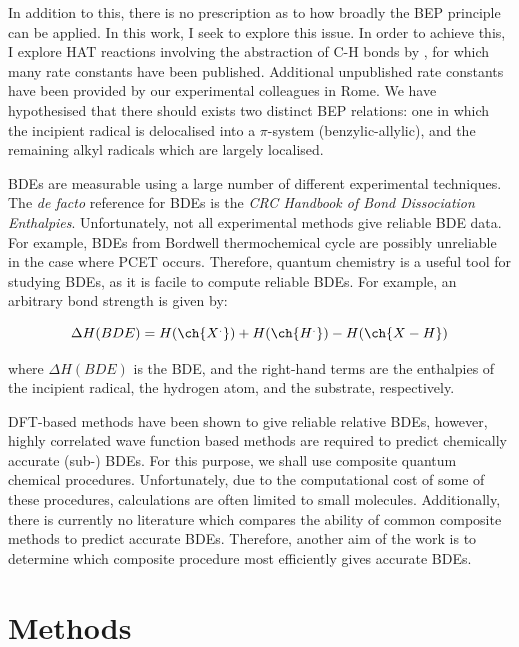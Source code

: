 In addition to this, there is no prescription as to how broadly the BEP principle can be applied. In this work, I seek to explore this issue. In order to achieve this, I explore HAT reactions involving the abstraction of C-H bonds by \cumo, for which many rate constants have been published.\cite{Bietti2010, Bietti2011, Pischel2001, Salamone2011, Salamone2012, Salamone2012a, Salamone2013, Salamone2015} Additional unpublished rate constants have been provided by our experimental colleagues in Rome. We have hypothesised that there should exists two distinct BEP relations: one in which the incipient radical is delocalised into a $\pi$-system (benzylic-allylic), and the remaining alkyl radicals which are largely localised.

BDEs are measurable using a large number of different experimental techniques. The \emph{de facto} reference for BDEs is the \emph{CRC Handbook of Bond Dissociation Enthalpies}.\cite{Luo2002} Unfortunately, not all experimental methods give reliable BDE data. For example, BDEs from Bordwell\cite{Bordwell1988} thermochemical cycle are possibly unreliable in the case where PCET occurs.\cite{Miller2016} Therefore, quantum chemistry is a useful tool for studying BDEs, as it is facile to compute reliable BDEs. For example, an arbitrary  bond strength is given by:

\begin{equation}
  \Delta H(BDE) =  H(\ch{X^.}) + H(\ch{H^.}) - H(\ch{X-H})
\end{equation}

\noindent where $\Delta H(BDE)$ is the BDE, and the right-hand terms are the enthalpies of the incipient radical, the hydrogen atom, and the substrate, respectively.

DFT-based methods have been shown to give reliable relative BDEs, however, highly correlated wave function based methods are required to predict chemically accurate (sub-\kcalmol) BDEs.\cite{DiLabio1999, Chan2012, Wiberg2014} For this purpose, we shall use composite quantum chemical procedures. Unfortunately, due to the computational cost of some of these procedures, calculations are often limited to small molecules. Additionally, there is currently no literature which compares the ability of common composite methods to predict accurate BDEs. Therefore, another aim of the work is to determine which composite procedure most efficiently gives accurate BDEs.

\section{Methods}


